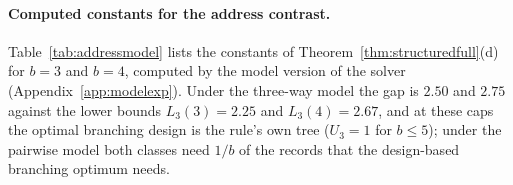 \paragraph{Computed constants for the address contrast.}
Table~\ref{tab:addressmodel} lists the constants of
Theorem~\ref{thm:structuredfull}(d) for $b=3$ and $b=4$, computed by the
model version of the solver (Appendix~\ref{app:modelexp}). Under the
three-way model the gap is $2.50$ and $2.75$ against the lower bounds
$L_3(3)=2.25$ and $L_3(4)=2.67$, and at these caps the optimal branching
design is the rule's own tree ($U_3=1$ for $b\le5$); under the pairwise model
both classes need $1/b$ of the records that the design-based branching
optimum needs.

